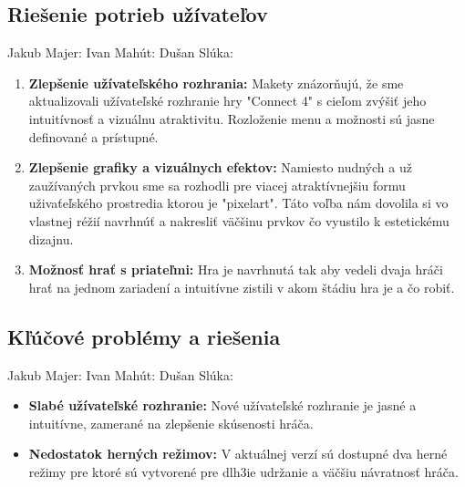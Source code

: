 \documentclass[a4paper, 11pt, onecolumn]{article}
\begin{document}
\subsection{Riešenie potrieb užívateľov}
Jakub Majer:
Ivan Mahút:
Dušan Slúka:
\begin{enumerate}
    \item \textbf{Zlepšenie užívateľského rozhrania:} Makety znázorňujú, že sme aktualizovali užívateľské rozhranie hry "Connect 4" s cieľom zvýšiť jeho intuitívnosť a vizuálnu atraktivitu. Rozloženie menu a možnosti sú jasne definované a prístupné.
    \item \textbf{Zlepšenie grafiky a vizuálnych efektov:} Namiesto nudných a už zaužívaných prvkou sme sa rozhodli pre viacej atraktívnejšiu formu uživaťeľského prostredia ktorou je "pixelart". Táto voľba nám dovolila si vo vlastnej réžií navrhnúť a nakresliť väčšinu prvkov čo vyustilo k estetickému dizajnu.
    \item \textbf{Možnosť hrať s priateľmi:} Hra je navrhnutá tak aby vedeli dvaja hráči hrať na jednom zariadení a intuitívne zistili v akom štádiu hra je a čo robiť.
\end{enumerate}

\subsection{Kľúčové problémy a riešenia}
Jakub Majer:
Ivan Mahút:
Dušan Slúka:
\begin{itemize}
    \item \textbf{Slabé užívateľské rozhranie:} Nové užívateľské rozhranie je jasné a intuitívne, zamerané na zlepšenie skúsenosti hráča.
    \item \textbf{Nedostatok herných režimov:} V aktuálnej verzí sú dostupné dva herné režimy pre ktoré sú vytvorené pre dlh3ie udržanie a väčšiu návratnosť hráča.
\end{itemize}
\end{document}

